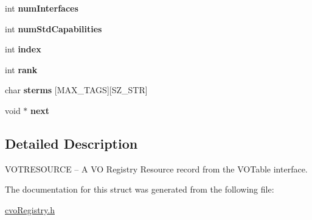 \begin{CompactItemize}
\item 
\hypertarget{structVOTResource_a6e6f90064b6035a8e8267c9364644b8}{
int \textbf{numInterfaces}}
\label{structVOTResource_a6e6f90064b6035a8e8267c9364644b8}

\item 
\hypertarget{structVOTResource_c6f794cadc4fee16856b54ea8fc7e581}{
int \textbf{numStdCapabilities}}
\label{structVOTResource_c6f794cadc4fee16856b54ea8fc7e581}

\item 
\hypertarget{structVOTResource_07709329c6d1ee32debe9593fb98d94e}{
int \textbf{index}}
\label{structVOTResource_07709329c6d1ee32debe9593fb98d94e}

\item 
\hypertarget{structVOTResource_463c75a06f79ac6e44793765864d1531}{
int \textbf{rank}}
\label{structVOTResource_463c75a06f79ac6e44793765864d1531}

\item 
\hypertarget{structVOTResource_85876b7c6265dc8e011eacf4b1349617}{
char \textbf{sterms} \mbox{[}MAX\_\-TAGS\mbox{]}\mbox{[}SZ\_\-STR\mbox{]}}
\label{structVOTResource_85876b7c6265dc8e011eacf4b1349617}

\item 
\hypertarget{structVOTResource_7f7a667414e3627777bb9cd029625b50}{
void $\ast$ \textbf{next}}
\label{structVOTResource_7f7a667414e3627777bb9cd029625b50}

\end{CompactItemize}


\subsection{Detailed Description}
VOTRESOURCE -- A VO Registry Resource record from the VOTable interface. 

The documentation for this struct was generated from the following file:\begin{CompactItemize}
\item 
\hyperlink{cvoRegistry_8h}{cvoRegistry.h}\end{CompactItemize}

